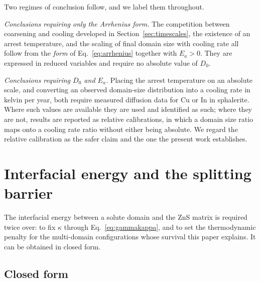 \documentclass[11pt,a4paper]{article}
\begin{document}
Two regimes of conclusion follow, and we label them throughout.

\emph{Conclusions requiring only the Arrhenius form.} The competition between
coarsening and cooling developed in Section~\ref{sec:timescales}, the existence
of an arrest temperature, and the scaling of final domain size with cooling rate
all follow from the \emph{form} of Eq.~\eqref{eq:arrhenius} together with
$E_a > 0$. They are expressed in reduced variables and require no absolute
value of $D_0$.

\emph{Conclusions requiring $D_0$ and $E_a$.} Placing the arrest temperature on
an absolute scale, and converting an observed domain-size distribution into a
cooling rate in kelvin per year, both require measured diffusion data for Cu or
In in sphalerite. Where such values are available they are used and identified
as such; where they are not, results are reported as relative calibrations, in
which a domain size ratio maps onto a cooling rate ratio without either being
absolute. We regard the relative calibration as the safer claim and the one the
present work establishes.

\section{Interfacial energy and the splitting barrier}
\label{sec:gamma}

The interfacial energy between a solute domain and the ZnS matrix is required
twice over: to fix $\kappa$ through Eq.~\eqref{eq:gammakappa}, and to set the
thermodynamic penalty for the multi-domain configurations whose survival this
paper explains. It can be obtained in closed form.

\subsection{Closed form}
\label{sec:gammaclosed}
\end{document}
